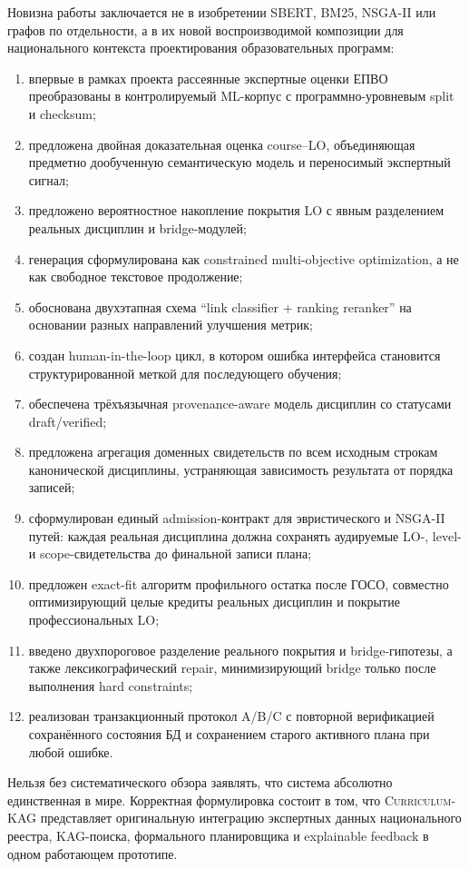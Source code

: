 \documentclass[twoside,11pt]{article}
\newcommand{\systemname}{\textsc{Curriculum-KAG}}
\begin{document}
Новизна работы заключается не в изобретении SBERT, BM25, NSGA-II или графов по отдельности, а в их новой воспроизводимой композиции для национального контекста проектирования образовательных программ:
\begin{enumerate}
  \item впервые в рамках проекта рассеянные экспертные оценки ЕПВО преобразованы в контролируемый ML-корпус с программно-уровневым split и checksum;
  \item предложена двойная доказательная оценка course--LO, объединяющая предметно дообученную семантическую модель и переносимый экспертный сигнал;
  \item предложено вероятностное накопление покрытия LO с явным разделением реальных дисциплин и bridge-модулей;
  \item генерация сформулирована как constrained multi-objective optimization, а не как свободное текстовое продолжение;
  \item обоснована двухэтапная схема ``link classifier + ranking reranker'' на основании разных направлений улучшения метрик;
  \item создан human-in-the-loop цикл, в котором ошибка интерфейса становится структурированной меткой для последующего обучения;
  \item обеспечена трёхъязычная provenance-aware модель дисциплин со статусами draft/verified;
  \item предложена агрегация доменных свидетельств по всем исходным строкам канонической дисциплины, устраняющая зависимость результата от порядка записей;
  \item сформулирован единый admission-контракт для эвристического и NSGA-II путей: каждая реальная дисциплина должна сохранять аудируемые LO-, level- и scope-свидетельства до финальной записи плана;
  \item предложен exact-fit алгоритм профильного остатка после ГОСО, совместно оптимизирующий целые кредиты реальных дисциплин и покрытие профессиональных LO;
  \item введено двухпороговое разделение реального покрытия и bridge-гипотезы, а также лексикографический repair, минимизирующий bridge только после выполнения hard constraints;
  \item реализован транзакционный протокол A/B/C с повторной верификацией сохранённого состояния БД и сохранением старого активного плана при любой ошибке.
\end{enumerate}

Нельзя без систематического обзора заявлять, что система абсолютно единственная в мире. Корректная формулировка состоит в том, что \systemname{} представляет оригинальную интеграцию экспертных данных национального реестра, KAG-поиска, формального планировщика и explainable feedback в одном работающем прототипе.
\end{document}
